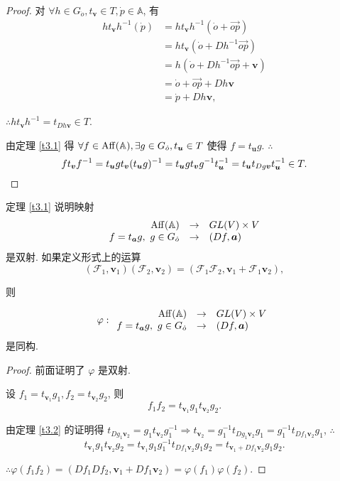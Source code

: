 \documentclass[color=black,device=normal,lang=cn,mode=geye]{elegantnote}
\begin{document}
\begin{proof}
    对 $\forall h\in G_{\dot{o}},t_{\boldsymbol{v}}\in T,\dot{p}\in\mathbb{A}$, 有
    \begin{align*}
        ht_{\boldsymbol{v}}h^{-1}(\dot{p}) & =ht_{\boldsymbol{v}}h^{-1}(\dot{o}+\overrightarrow{op}) \\
        & =ht_{\boldsymbol{v}}(\dot{o}+Dh^{-1}\overrightarrow{op}) \\
        & =h(\dot{o}+Dh^{-1}\overrightarrow{op}+\boldsymbol{v}) \\
        & =\dot{o}+\overrightarrow{op}+Dh\boldsymbol{v} \\
        & =\dot{p}+Dh\boldsymbol{v},
    \end{align*}

    $\therefore ht_{\boldsymbol{v}}h^{-1}=t_{Dh\boldsymbol{v}}\in T$.

    由定理 \ref{t3.1} 得 $\forall f\in\operatorname{Aff} (\mathbb{A}),\exists g\in G_{\dot{o}},t_{\boldsymbol{u}}\in T$ 使得 $f=t_{\boldsymbol{u}}g$. $\therefore$
    \[ft_{\boldsymbol{v}}f^{-1}=t_{\boldsymbol{u}}gt_{\boldsymbol{v}}(t_{\boldsymbol{u}}g)^{-1}=t_{\boldsymbol{u}}gt_{\boldsymbol{v}}g^{-1}t_{\boldsymbol{u}}^{-1}=t_{\boldsymbol{u}}t_{Dg\boldsymbol{v}}t_{\boldsymbol{u}}^{-1}\in T.\qedhere\]
\end{proof}
定理 \ref{t3.1} 说明映射
\[\begin{array}{rcl}
    \operatorname{Aff} (\mathbb{A}) & \to & GL (V)\times V \\
    f=t_{\boldsymbol{a}}g,\ g\in G_{\dot{o}} & \to & (Df,\boldsymbol{a}) \\
\end{array}\]
是双射. 如果定义形式上的运算
\[(\mathcal{F}_1,\boldsymbol{v}_1)(\mathcal{F}_2,\boldsymbol{v}_2)=(\mathcal{F}_1\mathcal{F}_2,\boldsymbol{v}_1+\mathcal{F}_1\boldsymbol{v}_2),\]

则
\begin{theorem}\label{t3.3}
    \[\varphi:\begin{array}{rcl}
        \operatorname{Aff} (\mathbb{A}) & \to & GL (V)\times V \\
        f=t_{\boldsymbol{a}}g,\ g\in G_{\dot{o}} & \to & (Df,\boldsymbol{a}) \\
    \end{array}\]
    是同构.
\end{theorem}
\begin{proof}
    前面证明了 $\varphi$ 是双射.

    设 $f_1=t_{\boldsymbol{v}_1}g_1,f_2=t_{\boldsymbol{v}_2}g_2$, 则
    \[f_1f_2=t_{\boldsymbol{v}_1}g_1t_{\boldsymbol{v}_2}g_2.\]

    由定理 \ref{t3.2} 的证明得 $t_{Dg_1\boldsymbol{v}_2}=g_1t_{\boldsymbol{v}_2}g_1^{-1}\Rightarrow t_{\boldsymbol{v}_2}=g_1^{-1}t_{Dg_1\boldsymbol{v}_2}g_1=g_1^{-1}t_{Df_1\boldsymbol{v}_2}g_1$, $\therefore$
    \[t_{\boldsymbol{v}_1}g_1t_{\boldsymbol{v}_2}g_2=t_{\boldsymbol{v}_1}g_1g_1^{-1}t_{Df_1\boldsymbol{v}_2}g_1g_2=t_{\boldsymbol{v}_1+Df_1\boldsymbol{v}_2}g_1g_2.\]

    $\therefore\varphi(f_1f_2)=(Df_1Df_2,\boldsymbol{v}_1+Df_1\boldsymbol{v}_2)=\varphi(f_1)\varphi(f_2)$.
\end{proof}
\end{document}

